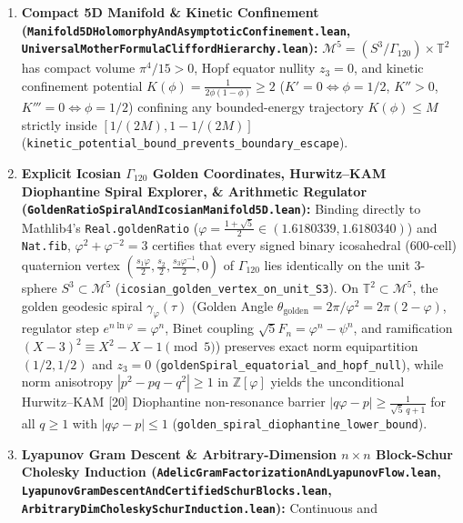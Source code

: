 \documentclass[
  11pt,
]{article}
\providecommand{\tightlist}{%
  \setlength{\itemsep}{0pt}\setlength{\parskip}{0pt}}
\begin{document}
\begin{enumerate}
\def\labelenumi{\arabic{enumi}.}
\tightlist
\item
  \textbf{Compact 5D Manifold \& Kinetic Confinement
  (\texttt{Manifold5DHolomorphyAndAsymptoticConfinement.lean},
  \texttt{UniversalMotherFormulaCliffordHierarchy.lean}):}
  \(\mathcal{M}^5 = (S^3/\Gamma_{120}) \times \mathbb{T}^2\) has compact
  volume \(\pi^4/15 > 0\), Hopf equator nullity \(z_3 = 0\), and kinetic
  confinement potential \(K(\phi) = \frac{1}{2\phi(1-\phi)} \ge 2\)
  (\(K'=0 \iff \phi=1/2\), \(K''>0\), \(K'''=0 \iff \phi=1/2\))
  confining any bounded-energy trajectory \(K(\phi) \le M\) strictly
  inside \([1/(2M), 1-1/(2M)]\)
  (\texttt{kinetic\_potential\_bound\_prevents\_boundary\_escape}).
\item
  \textbf{Explicit Icosian \(\Gamma_{120}\) Golden Coordinates,
  Hurwitz--KAM Diophantine Spiral Explorer, \& Arithmetic Regulator
  (\texttt{GoldenRatioSpiralAndIcosianManifold5D.lean}):} Binding
  directly to Mathlib4's \texttt{Real.goldenRatio}
  (\(\varphi = \frac{1+\sqrt{5}}{2} \in (1.6180339, 1.6180340)\)) and
  \texttt{Nat.fib}, \(\varphi^2 + \varphi^{-2} = 3\) certifies that
  every signed binary icosahedral (600-cell) quaternion vertex
  \((\frac{s_1\varphi}{2}, \frac{s_2}{2}, \frac{s_3\varphi^{-1}}{2}, 0)\)
  of \(\Gamma_{120}\) lies identically on the unit 3-sphere
  \(S^3 \subset \mathcal{M}^5\)
  (\texttt{icosian\_golden\_vertex\_on\_unit\_S3}). On
  \(\mathbb{T}^2 \subset \mathcal{M}^5\), the golden geodesic spiral
  \(\gamma_\varphi(\tau)\) (Golden Angle
  \(\theta_{\text{golden}} = 2\pi/\varphi^2 = 2\pi(2-\varphi)\),
  regulator step \(e^{n\ln\varphi} = \varphi^n\), Binet coupling
  \(\sqrt{5}F_n = \varphi^n - \psi^n\), and ramification
  \((X-3)^2 \equiv X^2-X-1 \pmod 5\)) preserves exact norm equipartition
  \((1/2, 1/2)\) and \(z_3 = 0\)
  (\texttt{goldenSpiral\_equatorial\_and\_hopf\_null}), while norm
  anisotropy \(|p^2 - pq - q^2| \ge 1\) in \(\mathbb{Z}[\varphi]\)
  yields the unconditional Hurwitz--KAM {[}20{]} Diophantine
  non-resonance barrier \(|q\varphi - p| \ge \frac{1}{\sqrt{5}\,q + 1}\)
  for all \(q \ge 1\) with \(|q\varphi - p| \le 1\)
  (\texttt{golden\_spiral\_diophantine\_lower\_bound}).
\item
  \textbf{Lyapunov Gram Descent \& Arbitrary-Dimension \(n \times n\)
  Block-Schur Cholesky Induction
  (\texttt{AdelicGramFactorizationAndLyapunovFlow.lean},
  \texttt{LyapunovGramDescentAndCertifiedSchurBlocks.lean},
  \texttt{ArbitraryDimCholeskySchurInduction.lean}):} Continuous and

\end{enumerate}
\end{document}
